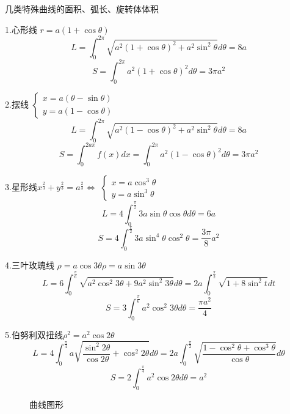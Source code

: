 \begin{definition}[特殊曲线]\label{def: 常用曲线}
	几类特殊曲线的面积、弧长、旋转体体积
	
	1.心形线 \quad $r=a(1+\cos \theta)$
	$$L=\int_{0}^{2\pi}\sqrt{a^2(1+\cos \theta)^2+a^2\sin^2\theta}d\theta=8a$$
	$$S=\int_{0}^{2\pi}a^2(1+\cos \theta)^2d\theta=3\pi a^2$$
	
	2.摆线\quad 
	$\left\lbrace
	\begin{array}{l}
		x=a(\theta-\sin \theta)\\
		y=a(1-\cos \theta)
	\end{array}
	 \right. $
	 $$L=\int_{0}^{2\pi}\sqrt{a^2(1-\cos \theta)^2+a^2\sin^2\theta}d\theta=8a$$
	 $$S=\int_{0}^{2a\pi}f(x)dx=\int_{0}^{2\pi}a^2(1-\cos \theta)^2d\theta=3\pi a^2$$
	
	3.星形线\quad $x^{\frac{2}{3}}+y^{\frac{2}{3}}=a^{\frac{2}{3}}\Leftrightarrow$
	$\left\lbrace
	\begin{array}{l}
		x=a\cos^3\theta\\
		y=a\sin^3\theta
	\end{array}
	 \right. $
	$$L=4\int_{0}^{\frac{\pi}{2}}3a\sin\theta\cos\theta d\theta=6a$$
	$$S=4\int_{0}^{\frac{\pi}{2}}3a\sin^4\theta\cos^2\theta=\frac{3\pi}{8}a^2$$
	
	4.三叶玫瑰线 \quad $\rho=a\cos 3\theta$\quad $\rho=a\sin 3\theta$
	$$L=6\int_{0}^{\frac{\pi}{6}}\sqrt{a^2\cos^2 3\theta+9a^2\sin^2 3\theta}d\theta=2a\int_{0}^{\frac{\pi}{2}}\sqrt{1+8\sin^2 t}dt$$
	$$S=3\int_{0}^{\frac{\pi}{6}}a^2\cos^2 3\theta d\theta=\frac{\pi a^2}{4}$$
	
	5.伯努利双扭线\quad $\rho^2=a^2\cos 2\theta$
	$$L=4\int_{0}^{\frac{\pi}{4}}a\sqrt{\frac{\sin^2 2\theta}{\cos 2\theta}+\cos^2 2\theta}d\theta=2a\int_{0}^{\frac{\pi}{2}}\sqrt{\dfrac{1-\cos^{2}\theta +\cos^{3}\theta}{\cos\theta}} d\theta$$
	$$S=2\int_{0}^{\frac{\pi}{4}}a^2\cos 2\theta d\theta=a^2$$
\end{definition}
\begin{figure}[H]
	\centering  %
	\caption{曲线图形}
\end{figure}




